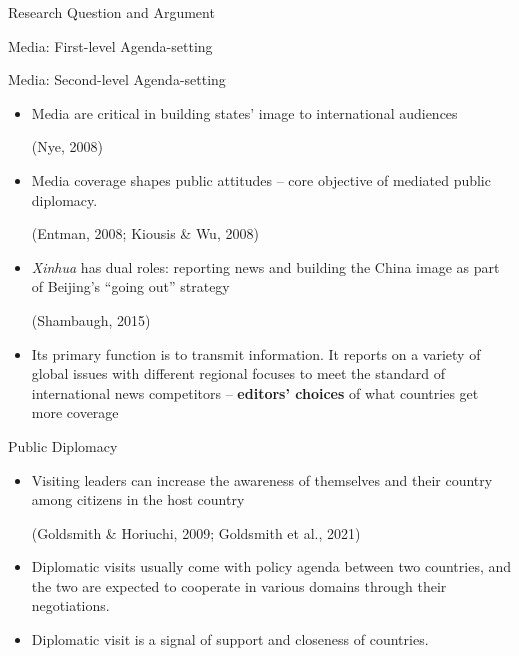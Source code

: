\documentclass{beamer}
\begin{document}
\begin{frame}{Research Question and Argument}
\begin{frame}{Media: First-level Agenda-setting}
\end{frame}

\begin{frame}{Media: Second-level Agenda-setting}


\begin{itemize}
\item Media are critical in building states’ image to international audiences \begin{footnotesize} (Nye, 2008) \end{footnotesize}

\item Media coverage shapes public attitudes -- core objective of mediated public diplomacy. \begin{footnotesize} (Entman, 2008; Kiousis \& Wu, 2008) \end{footnotesize}

\item \textit{Xinhua} has dual roles: reporting news and building the China
image as part of Beijing’s “going out” strategy \begin{footnotesize} (Shambaugh, 2015) \end{footnotesize}

\item Its primary function is to transmit information. It reports on a variety of global issues
with different regional focuses to meet the standard of international news competitors -- \textbf{editors' choices} of what countries get more coverage
\end{itemize}

\end{frame}

\begin{frame}{Public Diplomacy}


\begin{itemize}
\item Visiting leaders can increase the awareness of themselves and their country among
citizens in the host country \begin{footnotesize} (Goldsmith \& Horiuchi, 2009; Goldsmith et al., 2021) \end{footnotesize}

\item Diplomatic visits usually come with policy agenda between two countries,
and the two are expected to cooperate in various domains through their negotiations.

\item Diplomatic visit is a signal of support and closeness of countries.


\end{itemize}
\end{frame}
\end{frame}
\end{document}
